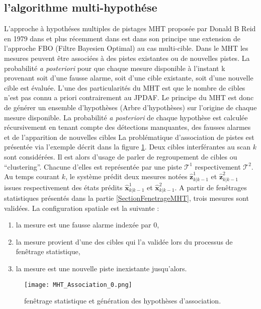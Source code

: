 \documentclass[10pt,french,a4paper]{report}
\begin{document}
   \subsection{l'algorithme multi-hypothése}
		L'approche à hypothéses multiples de pistages \acf{MHT} proposée par Donald B Reid en 1979 dans \cite{Reid1979} et plus récemment dans \cite{Kim2015} est dans son principe une extension de l'approche FBO (Filtre Bayesien Optimal) au cas multi-cible. Dans le \ac{MHT} les mesures peuvent être associées à des pistes existantes ou de nouvelles pistes. La probabilité \textit{a posteriori} pour que chaque mesure disponible à l'instant k provenant soit d'une fausse alarme, soit d'une cible existante, soit d'une nouvelle cible est évaluée. L'une des particularités du \ac{MHT} est que le nombre de cibles n'est pas connu a priori contrairement au \ac{JPDAF}. Le principe du \ac{MHT} est donc de générer un ensemble d'hypothèses (Arbre d'hypothèses) sur l'origine de chaque mesure disponible. La probabilité \textit{a posteriori} de chaque hypothèse est calculée récursivement en tenant compte des détections manquantes, des fausses alarmes et de l'apparition de nouvelles cibles
La problématique d'association de pistes est présentée via l'exemple décrit dans la figure \ref{fig:SectionFenetrageMHT}. Deux cibles interférantes au scan $k$ sont considérées. Il est alors d'usage de parler de regroupement de cibles ou ``clustering''. Chacune d'elles est représentée par une piste $\mathcal{T}^1$ respectivement $\mathcal{T}^2$. Au temps courant $k$, le système prédit deux mesures notées $\hat{\mathbf{z}}_{k|k-1}^1$ et   $\hat{\mathbf{z}}_{k|k-1}^2$  issues respectivement des états prédits   $\hat{\mathbf{x}}_{k|k-1}^1$   et  $\hat{\mathbf{x}}_{k|k-1}^2$. A partir de fenêtrages statistiques présentés dans la partie \ref{SectionFenetrageMHT}, trois mesures sont validées. La configuration spatiale est la suivante :
\begin{enumerate}
\item la mesure est une fausse alarme indexée par 0,
\item la mesure provient d'une des cibles qui l'a validée lors du processus de fenêtrage statistique, 
\item la mesure est une nouvelle piste inexistante jusqu'alors. 
\end{enumerate}
 
\begin{center}
 \begin{figure}[h!]
 \texttt{[image: MHT\_Association\_0.png]}
 \caption{fenêtrage statistique et génération des hypothèses d'association.}
  \label{fig:SectionFenetrageMHT}
 \end{figure}
\end{center}
 
\end{document}
